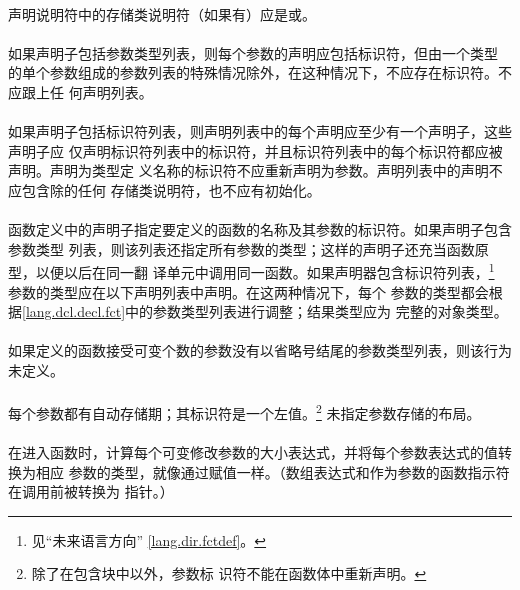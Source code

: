\paragraph{}
声明说明符中的存储类说明符（如果有）应是或。

\paragraph{}
如果声明子包括参数类型列表，则每个参数的声明应包括标识符，但由一个类型
的单个参数组成的参数列表的特殊情况除外，在这种情况下，不应存在标识符。不应跟上任
何声明列表。

\paragraph{}
如果声明子包括标识符列表，则声明列表中的每个声明应至少有一个声明子，这些声明子应
仅声明标识符列表中的标识符，并且标识符列表中的每个标识符都应被声明。声明为类型定
义名称的标识符不应重新声明为参数。声明列表中的声明不应包含除的任何
存储类说明符，也不应有初始化。

\semantic
\paragraph{}
函数定义中的声明子指定要定义的函数的名称及其参数的标识符。如果声明子包含参数类型
列表，则该列表还指定所有参数的类型；这样的声明子还充当函数原型，以便以后在同一翻
译单元中调用同一函数。如果声明器包含标识符列表，\footnote{见``未来语言方向''
\ref{lang.dir.fctdef}。} 参数的类型应在以下声明列表中声明。在这两种情况下，每个
参数的类型都会根据\ref{lang.dcl.decl.fct}中的参数类型列表进行调整；结果类型应为
完整的对象类型。

\paragraph{}
如果定义的函数接受可变个数的参数没有以省略号结尾的参数类型列表，则该行为未定义。

\paragraph{}
每个参数都有自动存储期；其标识符是一个左值。\footnote{除了在包含块中以外，参数标
识符不能在函数体中重新声明。} 未指定参数存储的布局。

\paragraph{}
在进入函数时，计算每个可变修改参数的大小表达式，并将每个参数表达式的值转换为相应
参数的类型，就像通过赋值一样。（数组表达式和作为参数的函数指示符在调用前被转换为
指针。）

